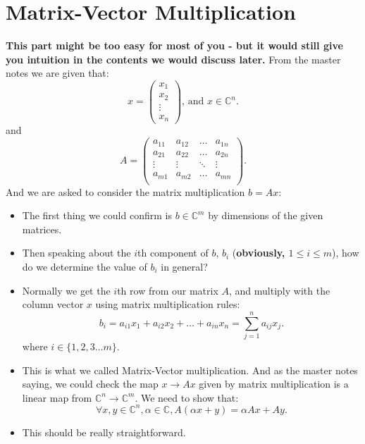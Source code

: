 \section{Matrix-Vector Multiplication}%

\textbf{This part might be too easy for most of you - but it would still give you intuition in the contents we would discuss later.} From the master notes we are given that:
\[
x = \begin{pmatrix} x_1\\x_2\\ \vdots\\ x_n \end{pmatrix} \text{, and } x \in \mathbb{C}^{n}
.\]
and
\[
  A = \begin{pmatrix} 
  a_{11} & a_{12} & \ldots & a_{1n} \\
a_{21} & a_{22} & \ldots & a_{2n} \\ 
\vdots & \vdots & \ddots & \vdots \\
a_{m1} & a_{m2} & \ldots & a_{mn} \\  
\end{pmatrix} 
.\] 
And we are asked to consider the matrix multiplication $b = Ax$:
\begin{itemize}
  \item The first thing we could confirm is $b \in \mathbb{C}^{m}$ by dimensions of the given matrices.
  \item Then speaking about the $i$th component of $b$, $b_i$ (\textbf{obviously, $1 \le i \le m$}), how do we determine the value of $b_i$ in general? 
  \item Normally we get the $i$th row from our matrix $A$, and multiply with the column vector $x$ using matrix multiplication rules:
    \[
    b_i = a_{i1}x_1 + a_{i2}x_2 + \ldots +  a_{in}x_n = \sum_{j = 1}^{n} a_{ij}x_j
    .\]
  where $i \in \{1, 2, 3 \ldots m\}$.
    \item This is what we called Matrix-Vector multiplication. And as the master notes saying, we could check the map $x \to  Ax$ given by matrix multiplication is a linear map from $\mathbb{C}^{n} \to \mathbb{C}^{m}$. We need to show that:
      \[
        \forall x, y \in \mathbb{C}^{n}, \alpha \in \mathbb{C}, A(\alpha x + y) = \alpha A x + A y
      .\]
    \item This should be really straightforward.
\end{itemize}
